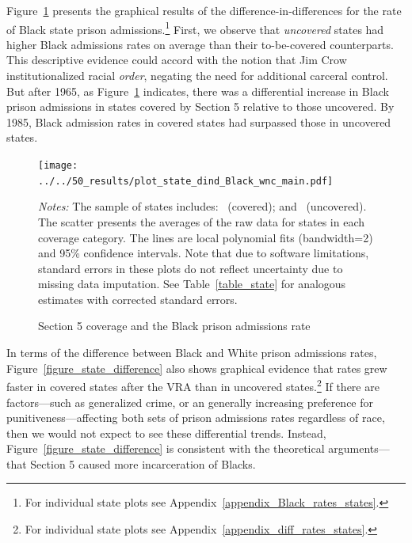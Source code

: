 \documentclass[12pt]{article}
\begin{document}
Figure~\ref{figure_state_section5} presents the graphical results of the difference-in-differences for the rate of Black state prison admissions.\footnote{For individual state plots see Appendix~\ref{appendix_Black_rates_states}.}  First, we observe that \emph{uncovered} states had higher Black admissions rates on average than their to-be-covered counterparts.  This descriptive evidence could accord with the notion that Jim Crow institutionalized racial \emph{order}, negating the need for additional carceral control.  But after 1965, as Figure~\ref{figure_state_section5} indicates, there was a differential increase in Black prison admissions in states covered by Section 5 relative to those uncovered.  By 1985, Black admission rates in covered states had surpassed those in uncovered states.




\begin{figure}[t!]
	\begin{center}
	\caption{Section 5 coverage and the Black prison admissions rate}
		\small \vspace*{.05in}
		\smallskip
				\texttt{[image: ../../50\_results/plot\_state\_dind\_Black\_wnc\_main.pdf]}
		\label{figure_state_section5}
		\end{center}
	\scriptsize{\emph{Notes:} The sample of states includes: \unskip~(covered); and \unskip~(uncovered).  The scatter presents the averages of the raw data for states in each coverage category.  The lines are local polynomial fits (bandwidth=2) and 95\% confidence intervals. Note that due to software limitations, standard errors in these plots do not reflect uncertainty due to missing data imputation. See Table~\ref{table_state} for analogous estimates with corrected standard errors.}
\end{figure} \normalsize


In terms of the difference between Black and White prison admissions rates, Figure~\ref{figure_state_difference} also shows graphical evidence that rates grew faster in covered states after the VRA than in uncovered states.\footnote{For individual state plots see Appendix~\ref{appendix_diff_rates_states}.} If there are factors---such as generalized crime, or an generally increasing preference for punitiveness---affecting both sets of prison admissions rates regardless of race, then we would not expect to see these differential trends. Instead, Figure~\ref{figure_state_difference} is consistent with the theoretical arguments---that Section 5 caused more incarceration of Blacks.
\end{document}
